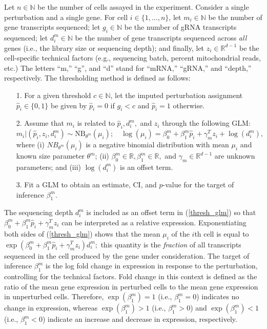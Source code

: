 \documentclass[12pt]{article}
\begin{document}
Let $n \in \mathbb{N}$ be the number of cells assayed in the experiment. Consider a single perturbation and a single gene. For cell $i \in \{1, \dots, n\}$, let $m_i \in \mathbb{N}$ be the number of gene transcripts sequenced; let $g_i \in \mathbb{N}$ be the number of gRNA transcripts sequenced; let $d^m_i \in \mathbb{N}$ be the number of gene transcripts sequenced across \textit{all} genes (i.e., the library size or sequencing depth); and finally, let $z_i \in \mathbb{R}^{d-1}$ be the cell-specific technical factors (e.g., sequencing batch, percent mitochondrial reads, etc.) The letters ``m,'' ``g'', and ``d'' stand for ``mRNA,'' ``gRNA,'' and ``depth,'' respectively. The thresholding method is defined as follows:
\begin{itemize}
	\item[1.] For a given threshold $c \in \mathbb{N}$, let the imputed perturbation assignment $\hat{p}_i \in \{0, 1\}$ be given by $\hat{p}_i = 0$ if  $g_i < c$ and $\hat{p}_i = 1$ otherwise.
	\item[2.] Assume that $m_i$ is related to $\hat{p}_i, d^m_i,$ and $z_i$ through the following GLM:
	\begin{equation}\label{thresh_glm}
	m_i | (\hat{p}_i, z_i, d^m_i) \sim \textrm{NB}_{\theta^m}(\mu_i); \quad
	\log(\mu_i) = \beta^m_0 + \beta^m_1 \hat{p}_i + \gamma^T_m z_i + \log\left(d_i^m\right),
	\end{equation}
	where (i) $NB_{\theta^m}(\mu_i)$ is a negative binomial distribution with mean $\mu_i$ and known size parameter $\theta^m$; (ii) $\beta^m_0 \in \mathbb{R}, \beta^m_1 \in \mathbb{R},$ and $\gamma_m \in  \mathbb{R}^{d-1}$ are unknown parameters; and (iii) $\log(d_i^m)$ is an offset term.
	
	\item[3.] Fit a GLM to obtain an estimate, CI, and $p$-value for the target of inference $\beta^m_1$.
\end{itemize}
The sequencing depth $d^m_i$ is included as an offset term in (\ref{thresh_glm}) so that $\beta^m_0 + \beta^m_1 \hat{p}_i + \gamma^T_m z_i$ can be interpreted as a relative expression. Exponentiating both sides of (\ref{thresh_glm}) shows that the mean $\mu_i$ of the $i$th cell is equal to
$\exp \left( \beta^m_0 + \beta^m_1 \hat{p}_i + \gamma^T_m z_i \right) d_i^m;$ this quantity is the \textit{fraction} of all transcripts sequenced in the cell produced by the gene under consideration. The target of inference $\beta^m_1$ is the log fold change in expression in response to the perturbation, controlling for the technical factors. Fold change in this context is defined as the ratio of the mean gene expression in perturbed cells to the mean gene expression in unperturbed cells. Therefore, $\exp(\beta^m_1) = 1$ (i.e., $\beta^m_1 = 0$) indicates no change in expression, whereas $\exp(\beta^m_1) > 1$ (i.e., $\beta^m_1 > 0$) and $\exp(\beta^m_1) < 1$ (i.e., $\beta^m_1 < 0$) indicate an increase and decrease in expression, respectively.
\end{document}
